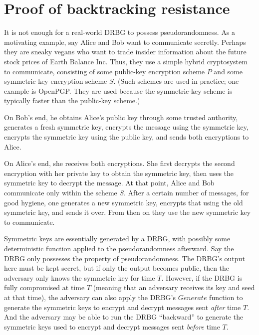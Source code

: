 \documentclass[12pt,lot, lof]{puthesis}
\begin{document}
{%



\section{Proof of backtracking resistance} \label{sec:proof_of_backtracking_resistance}

It is not enough for a real-world DRBG to possess pseudorandomness. As a motivating example, say Alice and Bob want to communicate secretly. Perhaps they are sneaky vegans who want to trade insider information about the future stock prices of Earth Balance Inc. Thus, they use a simple hybrid cryptosystem to communicate, consisting of some public-key encryption scheme $P$ and some symmetric-key encryption scheme $S$. (Such schemes are used in practice; one example is OpenPGP. They are used because the symmetric-key scheme is typically faster than the public-key scheme.)

On Bob's end, he obtains Alice's public key through some trusted authority, generates a fresh symmetric key, encrypts the message using the symmetric key, encrypts the symmetric key using the public key, and sends both encryptions to Alice.

On Alice's end, she receives both encryptions. She first decrypts the second encryption with her private key to obtain the symmetric key, then uses the symmetric key to decrypt the message. At that point, Alice and Bob communicate only within the scheme $S$. After a certain number of messages, for good hygiene, one generates a new symmetric key, encrypts that using the old symmetric key, and sends it over. From then on they use the new symmetric key to communicate.

Symmetric keys are essentially generated by a DRBG, with possibly some deterministic function applied to the pseudorandomness afterward. Say the DRBG only possesses the property of pseudorandomness. The DRBG's output here must be kept secret, but if only the output becomes public, then the adversary only knows the symmetric key for time $T$. However, if the DRBG is fully compromised at time $T$ (meaning that an adversary receives its key and seed at that time), the adversary can also apply the DRBG's $Generate$ function to generate the symmetric keys to encrypt and decrypt messages sent \emph{after} time $T$. And the adversary may be able to run the DRBG ``backward'' to generate the symmetric keys used to encrypt and decrypt messages sent \emph{before} time $T$.

}
\end{document}
